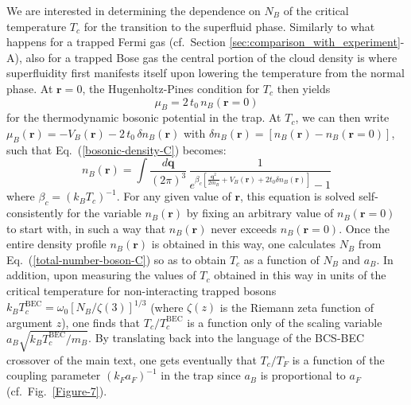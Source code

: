 \documentclass[pra,twocolumn,aps,amssymb,showpacs,superscriptaddress]{revtex4-1}
\begin{document}
We are interested in determining the dependence on $N_{B}$ of the critical temperature $T_{c}$ for the transition to the superfluid phase.
Similarly to what happens for a trapped Fermi gas (cf.~Section \ref{sec:comparison_with_experiment}-A), also for a trapped Bose gas the central portion of the cloud density is where superfluidity first manifests itself upon lowering the temperature from the normal phase.
At $\mathbf{r} = 0$, the Hugenholtz-Pines condition \cite{HP-1959} for $T_{c}$ then yields
\begin{equation}
\mu_{B} = 2 \, t_{0} \, n_{B}(\mathbf{r}=0) 
\label{Hugenholtz-Pines-condition-C}
\end{equation}
for the thermodynamic bosonic potential in the trap.
At $T_{c}$, we can then write $\mu_{B}(\mathbf{r}) = - V_{B}(\mathbf{r}) - 2 \, t_{0} \, \delta n_{B}(\mathbf{r})$ with $\delta n_{B}(\mathbf{r}) = \left[ n_{B}(\mathbf{r}) - n_{B}(\mathbf{r}=0) \right]$, such that
Eq.~(\ref{bosonic-density-C}) becomes:
\begin{equation}
n_{B}(\mathbf{r}) = \int \! \frac{d\mathbf{q}}{(2 \pi)^{3}} \, \frac{1}{e^{\beta_{c} \left[\frac{\mathbf{q}^{2}}{2m_{B}} + V_{B}(\mathbf{r}) + 2 t_{0} \delta n_{B}(\mathbf{r}) \right]} - 1}
\label{bosonic-density-at-Tc-C}
\end{equation}
where $\beta_{c} =(k_{B} T_{c})^{-1}$.
For any given value of $\mathbf{r}$, this equation is solved self-consistently for the variable $n_{B}(\mathbf{r})$ by fixing an arbitrary value of $n_{B}(\mathbf{r}=0)$ to start with, in such a way that $n_{B}(\mathbf{r})$ 
never exceeds $n_{B}(\mathbf{r}=0)$.
Once the entire density profile $n_{B}(\mathbf{r})$ is obtained in this way, one calculates $N_{B}$ from Eq.~(\ref{total-number-boson-C}) so as to obtain $T_{c}$ as a function of $N_{B}$ and $a_{B}$.
In addition, upon measuring the values of $T_{c}$ obtained in this way in units of the critical temperature for non-interacting trapped bosons $k_{B} T_{c}^{\mathrm{BEC}} = \omega_{0} \left[ N_{B}/\zeta(3)\right]^{1/3}$ 
(where $\zeta(z)$ is the Riemann zeta function of argument $z$), one finds that $T_{c}/T_{c}^{\mathrm{BEC}}$ is a function only of the scaling variable $a_{B} \sqrt{k_{B} T_{c}^{\mathrm{BEC}}/m_{B}}$.
By translating back into the language of the BCS-BEC crossover of the main text, one gets eventually that $T_{c}/T_{F}$ is a function of the coupling parameter $(k_{F} a_{F})^{-1}$ in the trap since $a_{B}$ is proportional to $a_{F}$ 
(cf.~Fig.~\ref{Figure-7}). 
\end{document}
